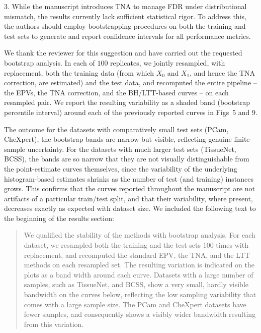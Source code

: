 \documentclass{article}
\newcommand{\response}[1]{\vspace*{1ex} \color{blue} \noindent #1 \color{black}
\vspace*{2ex}}
\newcommand{\edit}[1]{\begin{quotation}\color{red}\noindent #1
\color{black}\end{quotation}}
\begin{document}
3. While the manuscript introduces TNA to manage FDR under distributional mismatch, the results currently lack sufficient statistical rigor. To address this, the authors should employ bootstrapping procedures on both the training and test sets to generate and report confidence intervals for all performance metrics.

\response{We thank the reviewer for this suggestion and have carried out the requested bootstrap analysis. In each of $100$ replicates, we jointly resampled, with replacement, both the training data (from which $X_0$ and $X_1$, and hence the TNA correction, are estimated) and the test data, and recomputed the entire pipeline -- the EPVs, the TNA correction, and the BH/LTT-based curves -- on each resampled pair. We report the resulting variability as a shaded band (bootstrap percentile interval) around each of the previously reported curves in Figs~5 and 9.

The outcome for the datasets with comparatively small test sets (PCam, CheXpert), the bootstrap bands are narrow but visible, reflecting genuine finite-sample uncertainty. For the datasets with much larger test sets (TissueNet, BCSS), the bands are so narrow that they are not visually distinguishable from the point-estimate curves themselves, since the variability of the underlying histogram-based estimates shrinks as the number of test (and training) instances grows. This confirms that the curves reported throughout the manuscript are not artifacts of a particular train/test split, and that their variability, where present, decreases exactly as expected with dataset size. We included the following text to the beginning of the results section:}

\edit{We qualified the stability of the methods with bootstrap analysis. For each dataset, we resampled both the training and the test sets $100$ times with replacement, and recomputed the standard EPV, the TNA, and the LTT methods on each resampled set. The resulting variation is indicated on the plots as a band width around each curve. Datasets with a large number of samples, such as TissueNet, and BCSS, show a very small, hardly visible bandwidth on the curves below, reflecting the low sampling variability that comes with a large sample size. The PCam and CheXpert datasets have fewer samples, and consequently shows a visibly wider bandwidth resulting from this variation.}



\end{document}

